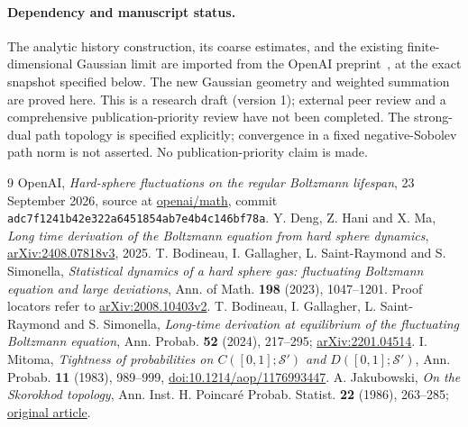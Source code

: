 \documentclass[11pt]{article}
\numberwithin{equation}{section}
\theoremstyle{remark}
\newif\iffunctional
\begin{document}
\paragraph{Dependency and manuscript status.}
The analytic history construction, its coarse estimates, and the existing
finite-dimensional Gaussian limit are imported from the OpenAI
preprint~\cite{U}, at the exact snapshot specified below.
The new Gaussian geometry and weighted summation are proved here.
This is a research draft (version 1); external peer review and a comprehensive
publication-priority review have not been completed.
The strong-dual path topology is specified explicitly; convergence in a fixed negative-Sobolev path norm is not asserted. No publication-priority claim is made.





\iffunctional



\fi
\begin{thebibliography}{9}
OpenAI, \emph{Hard-sphere fluctuations on the regular Boltzmann lifespan},
23 September 2026, source at
\href{https://github.com/openai/math/tree/adc7f1241b42e322a6451854ab7e4b4c146bf78a/preprints/Hard-sphere-fluctuations-on-the-regular-Boltzmann-lifespan-September-23-2026/build}{openai/math},
commit \texttt{adc7f1241b42e322a6451854ab7e4b4c146bf78a}.
Y. Deng, Z. Hani and X. Ma,
\emph{Long time derivation of the Boltzmann equation from hard sphere dynamics},
\href{https://arxiv.org/abs/2408.07818v3}{arXiv:2408.07818v3}, 2025.
T. Bodineau, I. Gallagher, L. Saint-Raymond and S. Simonella,
\emph{Statistical dynamics of a hard sphere gas: fluctuating Boltzmann
equation and large deviations}, Ann. of Math. \textbf{198} (2023), 1047--1201.
Proof locators refer to
\href{https://arxiv.org/html/2008.10403v2}{arXiv:2008.10403v2}.
T. Bodineau, I. Gallagher, L. Saint-Raymond and S. Simonella,
\emph{Long-time derivation at equilibrium of the fluctuating Boltzmann equation},
Ann. Probab. \textbf{52} (2024), 217--295;
\href{https://arxiv.org/abs/2201.04514}{arXiv:2201.04514}.
I. Mitoma, \emph{Tightness of probabilities on $C([0,1];\mathcal S')$
and $D([0,1];\mathcal S')$}, Ann. Probab. \textbf{11} (1983), 989--999,
\href{https://doi.org/10.1214/aop/1176993447}{doi:10.1214/aop/1176993447}.
A. Jakubowski, \emph{On the Skorokhod topology}, Ann. Inst. H. Poincar\'e
Probab. Statist. \textbf{22} (1986), 263--285;
\href{https://www.numdam.org/item/AIHPB_1986__22_3_263_0.pdf}{original article}.
\end{thebibliography}
\end{document}

